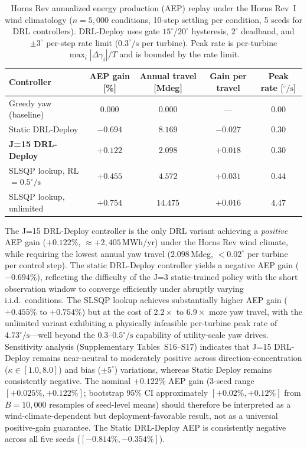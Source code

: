 \documentclass[final,5p,times]{elsarticle}
\begin{document}
\begin{table}[h]
\centering
\caption{Horns Rev annualized energy production (AEP) replay under the Horns Rev~I wind climatology ($n{=}5{,}000$ conditions, 10-step settling per condition, 5 seeds for DRL controllers). DRL-Deploy uses gate $15^\circ$/$20^\circ$ hysteresis, $2^\circ$ deadband, and ${\pm}3^\circ$ per-step rate limit ($0.3^\circ\!/\!\mathrm{s}$ per turbine). Peak rate is per-turbine $\max_i|\Delta\gamma_i|/T$ and is bounded by the rate limit.}
\label{tab:deploy_aep}
\small
\begin{tabular}{lcccc}
\toprule
Controller & AEP gain [\%] & Annual travel [Mdeg] & Gain per travel & Peak rate [$^\circ\!/\!\mathrm{s}$] \\
\midrule
Greedy yaw (baseline) & $0.000$ & $0.000$ & --- & $0.00$ \\
Static DRL-Deploy & $-0.694$ & $8.169$ & $-0.027$ & $0.30$ \\
\textbf{J=15 DRL-Deploy} & $\mathbf{+0.122}$ & $\mathbf{2.098}$ & $\mathbf{+0.018}$ & $0.30$ \\
SLSQP lookup, RL$=0.5^\circ\!/\!\mathrm{s}$ & $+0.455$ & $4.572$ & $+0.031$ & $0.44$ \\
SLSQP lookup, unlimited & $+0.754$ & $14.475$ & $+0.016$ & $4.47$ \\
\bottomrule
\end{tabular}
\end{table}

The J=15 DRL-Deploy controller is the only DRL variant achieving a \emph{positive} AEP gain ($+0.122\%$, ${\approx}{+}2{,}405$\,MWh/yr) under the Horns Rev wind climate, while requiring the lowest annual yaw travel ($2.098$\,Mdeg, ${<}0.02^\circ$ per turbine per control step). The static DRL-Deploy controller yields a negative AEP gain ($-0.694\%$), reflecting the difficulty of the J=3 static-trained policy with the short observation window to converge efficiently under abruptly varying i.i.d.\ conditions. The SLSQP lookup achieves substantially higher AEP gain ($+0.455\%$ to $+0.754\%$) but at the cost of $2.2{\times}$ to $6.9{\times}$ more yaw travel, with the unlimited variant exhibiting a physically infeasible per-turbine peak rate of $4.73^\circ\!/\!\mathrm{s}$---well beyond the $0.3$--$0.5^\circ\!/\!\mathrm{s}$ capability of utility-scale yaw drives. Sensitivity analysis (Supplementary Tables~S16--S17) indicates that J=15 DRL-Deploy remains near-neutral to moderately positive across direction-concentration ($\kappa{\in}[1.0,8.0]$) and bias ($\pm5^\circ$) variations, whereas Static Deploy remains consistently negative. The nominal $+0.122\%$ AEP gain (3-seed range $[+0.025\%, +0.122\%]$; bootstrap 95\% CI approximately $[+0.02\%, +0.12\%]$ from $B{=}10{,}000$ resamples of seed-level means) should therefore be interpreted as a wind-climate-dependent but deployment-favorable result, not as a universal positive-gain guarantee. The Static DRL-Deploy AEP is consistently negative across all five seeds ($[-0.814\%, -0.354\%]$).
\end{document}
